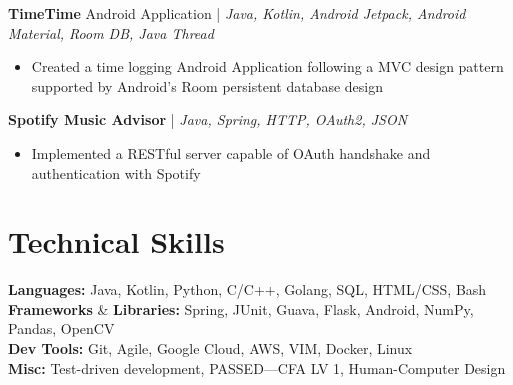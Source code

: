 \documentclass[12pt, letterpaper]{article}
\begin{document}
\textbf{TimeTime} Android Application | \small\textit{Java, Kotlin, Android Jetpack, Android Material, Room DB, Java Thread}
\begin{itemize}[noitemsep,topsep=0pt]
  \item Created a time logging Android Application following a MVC design pattern supported by Android's Room persistent database design
\end{itemize}

\textbf{Spotify Music Advisor} | \small\textit{Java, Spring, HTTP, OAuth2, JSON}
\begin{itemize}[noitemsep,topsep=0pt]
  \item Implemented a RESTful server capable of OAuth handshake and authentication with Spotify
\end{itemize}

\section{Technical Skills}
\textbf{Languages:} Java, Kotlin, Python, C/C++, Golang, SQL, HTML/CSS, Bash \\
\textbf{Frameworks} \& \textbf{Libraries:} Spring, JUnit, Guava, Flask, Android, NumPy, Pandas, OpenCV \\
\textbf{Dev Tools:} Git, Agile, Google Cloud, AWS, VIM, Docker, Linux \\
\textbf{Misc:} Test-driven development, PASSED---CFA LV 1, Human-Computer Design
\end{document}
